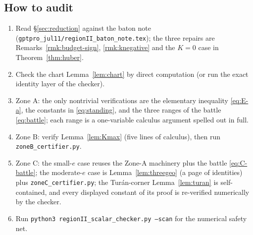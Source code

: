 \documentclass[11pt]{article}
\begin{document}
\subsection*{How to audit}

\begin{enumerate}[label=\textup{(\alph*)}]
\item Read \S\ref{sec:reduction} against the baton note
(\texttt{gptpro\_jul11/regionII\_baton\_note.tex}); the three repairs are
Remarks~\ref{rmk:budget-sign}, \ref{rmk:knegative} and the $K=0$ case in
Theorem~\ref{thm:huber}.
\item Check the chart Lemma~\ref{lem:chart} by direct computation (or run
the exact identity layer of the checker).
\item Zone A: the only nontrivial verifications are the elementary
inequality \eqref{eq:E-a}, the constants in \eqref{eq:standing}, and the
three ranges of the battle \eqref{eq:battle}; each range is a one-variable
calculus argument spelled out in full.
\item Zone B: verify Lemma~\ref{lem:Kmax} (five lines of calculus), then
run \texttt{zoneB\_certifier.py}.
\item Zone C: the small-$e$ case reuses the Zone-A machinery plus the
battle \eqref{eq:C-battle}; the moderate-$e$ case is
Lemma~\ref{lem:threegeo} (a page of identities) plus
\texttt{zoneC\_certifier.py}; the Tur\'an-corner Lemma~\ref{lem:turan} is
self-contained, and every displayed constant of its proof is re-verified
numerically by the checker.
\item Run \texttt{python3 regionII\_scalar\_checker.py --scan} for the
numerical safety net.
\end{enumerate}
\end{document}
